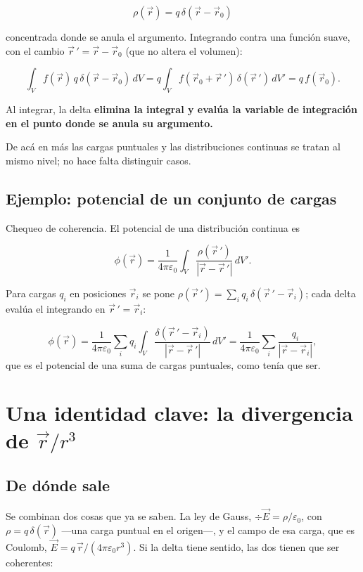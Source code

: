 \documentclass[12pt,a4paper]{article}
\begin{document}
\begin{keybox}
\[
\boxed{\ \rho(\vec r) = q\,\delta(\vec r-\vec r_0)\ }
\]
\end{keybox}
concentrada donde se anula el argumento. Integrando contra una función suave,
con el cambio $\vec r\,' = \vec r - \vec r_0$ (que no altera el volumen):

\[
\int_V f(\vec r)\,q\,\delta(\vec r-\vec r_0)\,dV
= q\int_V f(\vec r_0+\vec r\,')\,\delta(\vec r\,')\,dV' = q\,f(\vec r_0).
\]

\begin{notebox}
Al integrar, la delta \textbf{elimina la integral y evalúa la
variable de integración en el punto donde se anula su argumento.}
\end{notebox}

De acá en más las cargas puntuales y las distribuciones continuas se tratan al
mismo nivel; no hace falta distinguir casos.

\subsection{Ejemplo: potencial de un conjunto de cargas}

Chequeo de coherencia. El potencial de una distribución continua es

\[
\phi(\vec r) = \frac{1}{4\pi\varepsilon_0}\int_V
\frac{\rho(\vec r\,')}{|\vec r-\vec r\,'|}\,dV' .
\]

Para cargas $q_i$ en posiciones $\vec r_i$ se pone
$\rho(\vec r\,') = \sum_i q_i\,\delta(\vec r\,'-\vec r_i)$; cada delta evalúa
el integrando en $\vec r\,' = \vec r_i$:

\[
\phi(\vec r) = \frac{1}{4\pi\varepsilon_0}\sum_i q_i\int_V
\frac{\delta(\vec r\,'-\vec r_i)}{|\vec r-\vec r\,'|}\,dV'
= \frac{1}{4\pi\varepsilon_0}\sum_i\frac{q_i}{|\vec r-\vec r_i|},
\]
que es el potencial de una suma de cargas puntuales, como tenía que ser.

\section{Una identidad clave: la divergencia de \texorpdfstring{$\vec r/r^3$}{r/r3}}

\subsection{De dónde sale}

Se combinan dos cosas que ya se saben. La ley de Gauss,
$\div \vec E = \rho/\varepsilon_0$, con $\rho = q\,\delta(\vec r)$ ---una
carga puntual en el origen---, y el campo de esa carga, que es Coulomb,
$\vec E = q\,\vec r/(4\pi\varepsilon_0 r^3)$. Si la delta tiene sentido, las dos
tienen que ser coherentes:
\end{document}
